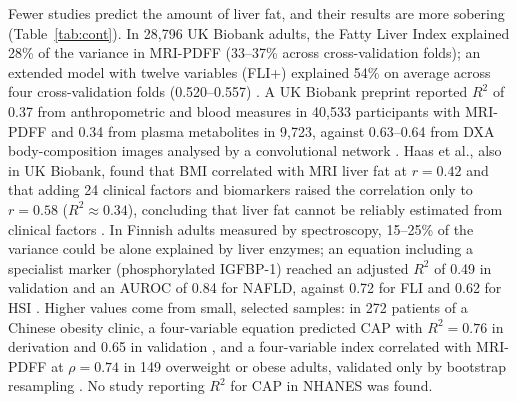 Fewer studies predict the amount of liver fat, and their results are more sobering (Table~\ref{tab:cont}). In 28,796 UK Biobank adults, the Fatty Liver Index explained 28\% of the variance in MRI-PDFF (33--37\% across cross-validation folds); an extended model with twelve variables (FLI+) explained 54\% on average across four cross-validation folds (0.520--0.557) \cite{asaturyan2022fli}. A UK Biobank preprint reported $R^2$ of 0.37 from anthropometric and blood measures in 40,533 participants with MRI-PDFF and 0.34 from plasma metabolites in 9,723, against 0.63--0.64 from DXA body-composition images analysed by a convolutional network \cite{insitro2024ukb}. Haas et al., also in UK Biobank, found that BMI correlated with MRI liver fat at $r = 0.42$ and that adding 24 clinical factors and biomarkers raised the correlation only to $r = 0.58$ ($R^2 \approx 0.34$), concluding that liver fat cannot be reliably estimated from clinical factors \cite{haas2021liverfat}. In Finnish adults measured by spectroscopy, 15--25\% of the variance could be alone explained by liver enzymes; an equation including a specialist marker (phosphorylated IGFBP-1) reached an adjusted $R^2$ of 0.49 in validation and an AUROC of 0.84 for NAFLD, against 0.72 for FLI and 0.62 for HSI \cite{petaja2016igfbp}. Higher values come from small, selected samples: in 272 patients of a Chinese obesity clinic, a four-variable equation predicted CAP with $R^2 = 0.76$ in derivation and 0.65 in validation \cite{liu2022surrogate}, and a four-variable index correlated with MRI-PDFF at $\rho = 0.74$ in 149 overweight or obese adults, validated only by bootstrap resampling \cite{chen2023shsi}. No study reporting $R^2$ for CAP in NHANES was found.

